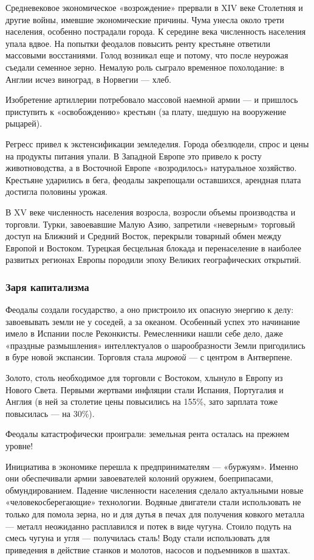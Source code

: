 Средневековое экономическое «возрождение» прервали в \foreignlanguage{english}{XIV} веке Столетняя и другие войны, имевшие экономические причины. Чума унесла около трети населения, особенно пострадали города. К середине века численность населения упала вдвое. На попытки феодалов повысить ренту крестьяне ответили массовыми восстаниями. Голод возникал еще и потому, что после неурожая съедали семенное зерно. Немалую роль сыграло временное похолодание: в Англии исчез виноград, в Норвегии — хлеб.

Изобретение артиллерии потребовало массовой наемной армии — и пришлось приступить к «освобождению» крестьян (за плату, шедшую на вооружение рыцарей).

Регресс привел к экстенсификации земледелия. Города обезлюдели, спрос и цены на продукты питания упали. В Западной Европе это привело к росту животноводства, а в Восточной Европе «возродилось» натуральное хозяйство. Крестьяне ударились в бега, феодалы закрепощали оставшихся, арендная плата достигла половины урожая.

В \foreignlanguage{english}{XV} веке численность населения возросла, возросли объемы производства и торговли. Турки,
завоевавшие Малую Азию, запретили «неверным» торговый доступ на Ближний и Средний Восток, перекрыли товарный обмен
между Европой и Востоком. Турецкая бесцельная блокада и перенаселение в наиболее развитых регионах Европы породили
эпоху Великих географических открытий.

\subsubsection[Заря капитализма]{Заря капитализма}

Феодалы создали государство, а оно пристроило их опасную энергию к делу: завоевывать земли не у соседей, а за океаном.
Особенный успех это начинание имело в Испании после Реконкисты. Ремесленники нашли себе дело, даже «праздные
размышления» интеллектуалов о шарообразности Земли пригодились в буре новой экспансии. Торговля стала \textit{мировой}
— с центром в Антверпене.


Золото, столь необходимое для торговли с Востоком, хлынуло в Европу из Нового Света. Первыми жертвами инфляции стали
Испания, Португалия и Англия (в ней за столетие цены повысились на 155\%, зато зарплата тоже повысилась — на 30\%).


Феодалы катастрофически проиграли: земельная рента осталась на прежнем уровне!


Инициатива в экономике перешла к предпринимателям — «буржуям». Именно они обеспечивали армии завоевателей колоний
оружием, боеприпасами, обмундированием. Падение численности населения сделало актуальными новые «человекосберегающие»
технологии. Водяные двигатели стали использовать не только для помола зерна, но и для дутья в печах для получения
ковкого металла — металл неожиданно расплавился и потек в виде чугуна. Стоило подуть на смесь чугуна и угля —
получилась сталь! Воду стали использовать для приведения в действие станков и молотов, насосов и подъемников в шахтах.


